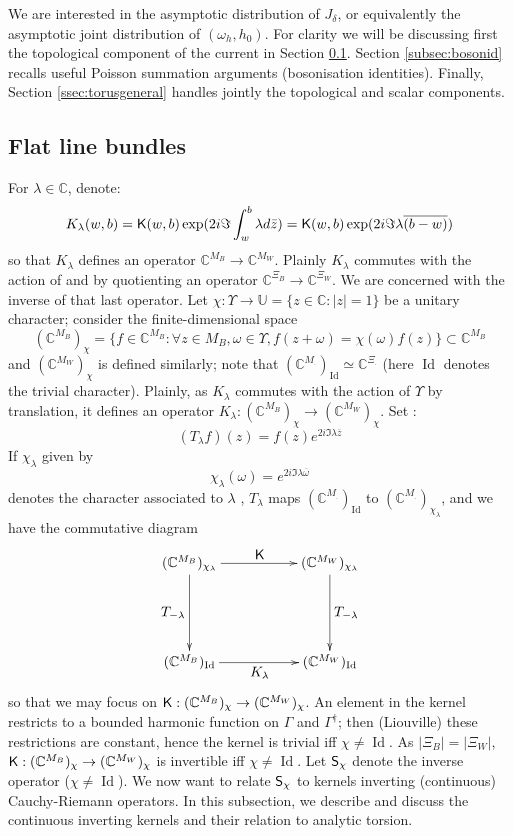 \documentclass[10pt]{article}
\newcommand{\C}{\mathbb{C}}
\newcommand{\U}{\mathbb{U}}
\newcommand{\rK}{{\sf K}}
\newcommand{\rS}{{\sf S}}
\newcommand{\dg}{\dagger}
\DeclareMathOperator{\Id}{Id}
\begin{document}
We are interested in the asymptotic distribution of $J_\delta$, or equivalently the asymptotic joint distribution of $(\omega_h,h_0)$. For clarity we will be discussing first the topological component of the current in Section \ref{ss:linebundles}. Section \ref{subsec:bosonid} recalls useful Poisson summation arguments (bosonisation identities). Finally, Section \ref{ssec:torusgeneral} handles jointly the topological and scalar components.





\subsection{Flat line bundles}\label{ss:linebundles}

For $\lambda\in\C$, denote:
$$K_\lambda(w,b)=\rK(w,b)\exp(2i\Im\int_w^b\lambda d\bar z)=\rK(w,b)\exp(2i\Im\lambda\overline{(b-w)})$$
so that $K_\lambda$ defines an operator $\C^{M_B}\rightarrow\C^{M_W}$. Plainly $K_\lambda$ commutes with the action of  and by quotienting an operator $\C^{\Xi_B}\rightarrow\C^{\Xi_W}$. We are concerned with the inverse of that last operator. 
Let $\chi:\Upsilon\rightarrow \U=\{z\in\C:|z|=1\}$ be a unitary character; consider the finite-dimensional space 
$$(\C^{M_B})_\chi=\{f\in\C^{M_B}:\forall z\in M_B, \omega\in \Upsilon, f(z+\omega)=\chi(\omega)f(z)\}\subset \C^{M_B}$$
and $(\C^{M_W})_\chi$ is defined similarly; note that $(\C^{M_.})_{\Id}\simeq \C^{\Xi_.}$ (here $\Id$ denotes the trivial character). Plainly, as $K_\lambda$ commutes with the action of $\Upsilon$ by translation, it defines an operator $K_\lambda:(\C^{M_B})_\chi\rightarrow(\C^{M_W})_\chi$. Set :
$$(T_\lambda f)(z)=f(z)e^{2i\Im\lambda\overline z}$$
If $\chi_\lambda$ given by 
\begin{equation}\label{eq:chilambda}
\chi_\lambda(\omega)=e^{2i\Im\lambda\overline\omega}
\end{equation}
denotes the character associated to $\lambda$ , $T_\lambda$ maps $(\C^{M_.})_{\Id}$ to $(\C^{M_.})_{\chi_\lambda}$, and we have the commutative diagram
$$ \xymatrix{
 (\C^{M_B})_{\chi_\lambda} \ar@{->}[rr]^{\displaystyle \rK} \ar@{->}[dd]_{\displaystyle T_{-\lambda}}
      && (\C^{M_W})_{\chi_\lambda} \ar@{->}[dd]^{\displaystyle T_{-\lambda}}    \\ \\
 (\C^{M_B})_{\Id} \ar@{->}[rr]_{\displaystyle K_\lambda} && (\C^{M_W})_{\Id}
 }
 $$
so that we may focus on $\rK:(\C^{M_B})_{\chi}\rightarrow(\C^{M_W})_{\chi}$. An element in the kernel restricts to a bounded harmonic function on $\Gamma$ and $\Gamma^\dg$; then (Liouville) these restrictions are constant, hence the kernel is trivial iff $\chi\neq\Id$. As $|\Xi_B|=|\Xi_W|$, $\rK:(\C^{M_B})_{\chi}\rightarrow(\C^{M_W})_{\chi}$ is invertible iff $\chi\neq\Id$. Let $\rS_\chi$ denote the inverse operator ($\chi\neq\Id$). We now want to relate $\rS_\chi$ to kernels inverting (continuous) Cauchy-Riemann operators. In this subsection, we describe and discuss the continuous inverting kernels and their relation to analytic torsion.
\end{document}
